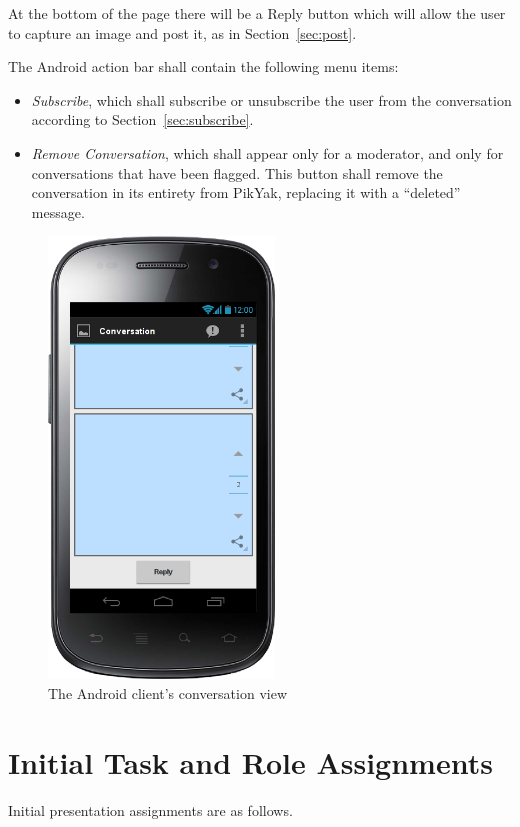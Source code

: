 \documentclass[11pt]{scrartcl}
\let\stdsection\section
\renewcommand\section{\newpage\stdsection}
\begin{document}
        At the bottom of the page there will be a Reply button which will allow the user to capture an image and post it, as in Section~\ref{sec:post}.

        The Android action bar shall contain the following menu items:

        \begin{itemize}
            \item \emph{Subscribe}, which shall subscribe or unsubscribe the user from the conversation according to Section~\ref{sec:subscribe}.
            \item \emph{Remove Conversation}, which shall appear only for a moderator, and only for conversations that have been flagged.  This button shall remove the conversation in its entirety from PikYak, replacing it with a ``deleted'' message.
        \end{itemize}

        \begin{figure}[h]
            \centering \includegraphics[width=6cm,keepaspectratio]{mockups/conversation-view}
            \caption{The Android client's conversation view}
            \label{fig:conversationscreen}
        \end{figure}

\section{Initial Task and Role Assignments}
    Initial presentation assignments are as follows.
\end{document}
